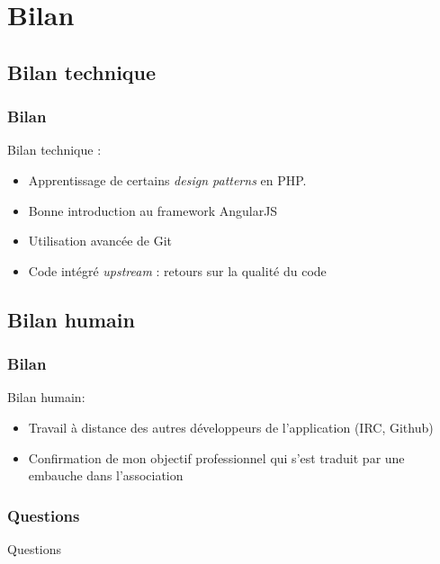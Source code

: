 \documentclass[12pt]{beamer}
\begin{document}
	\section{Bilan}
	\subsection{Bilan technique}
	\begin{frame}
		\frametitle{Bilan}
		Bilan technique :
		\begin{itemize}
			\item Apprentissage de certains \textit{design patterns} en PHP.
			\item Bonne introduction au framework AngularJS
			\item Utilisation avancée de Git
			\item Code intégré \textit{upstream} : retours sur la qualité du code
		\end{itemize}
	\end{frame}
	\subsection{Bilan humain}
	\begin{frame}
		\frametitle{Bilan}
		Bilan humain:
		\begin{itemize}
			\item Travail à distance des autres développeurs de l'application (IRC, Github)
			\item Confirmation de mon objectif professionnel qui s'est traduit par une embauche dans l'association
		\end{itemize}
	\end{frame}
	\begin{frame}
		\frametitle{Questions}
		\centering \LARGE Questions
	\end{frame}
\end{document}
